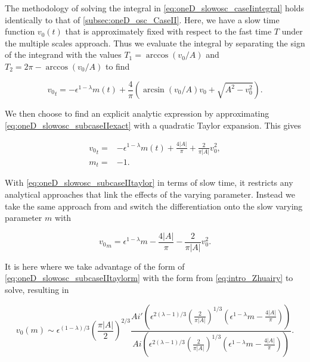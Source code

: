 \indent The methodology of solving the integral in \eqref{eq:oneD_slowosc_caseIintegral} holds identically to that of \autoref{subsec:oneD_osc_CaseII}. Here, we have a slow time function $v_0(t)$ that is approximately fixed with respect to the fast time $T$ under the multiple scales approach. Thus we evaluate the integral by separating the sign of the integrand with the values $T_1=\arccos(v_0/A)$ and $T_2 = 2\pi-\arccos(v_0/A)$ to find

\begin{equation}\label{eq:oneD_slowosc_subcaseIIexact}
{v_0}_t=-\epsilon^{1-\lambda}m(t)+\frac{4}{\pi}\left(\arcsin(v_0/A)v_0+\sqrt{A^2-v_0^2}\right).
\end{equation}

We then choose to find an explicit analytic expression by approximating \eqref{eq:oneD_slowosc_subcaseIIexact} with a quadratic Taylor expansion. This gives

\begin{equation}\label{eq:oneD_slowosc_subcaseIItaylor}
\begin{aligned}
{v_0}_t =& -\epsilon^{1-\lambda}m(t) + \frac{4|A|}{\pi} + \frac{2}{\pi |A|}v_0^2,\\
m_t =& -1.
\end{aligned}
\end{equation}

With \eqref{eq:oneD_slowosc_subcaseIItaylor} in terms of slow time, it restricts any analytical approaches that link the effects of the varying parameter. Instead we take the same approach from \cite{haberman1979slowly} and switch the differentiation onto the slow varying parameter $m$ with

\begin{equation}\label{eq:oneD_slowosc_subcaseIItaylorm}
{v_0}_m = \epsilon^{1-\lambda}m - \frac{4|A|}{\pi} - \frac{2}{\pi |A|}v_0^2.
\end{equation}

It is here where we take advantage of the form of \eqref{eq:oneD_slowosc_subcaseIItaylorm} with the form from \eqref{eq:intro_Zhuairy} to solve, resulting in

\begin{equation*}
v_0(m)\sim \epsilon^{(1-\lambda)/3}\left( \frac{\pi |A|}{2} \right)^{2/3}\frac{Ai'\left(\epsilon^{2(\lambda-1)/3}\left(\frac{2}{\pi |A|}\right)^{1/3}(\epsilon^{1-\lambda}m-\frac{4|A|}{\pi})\right)}{Ai\left(\epsilon^{2(\lambda-1)/3}\left(\frac{2}{\pi |A|}\right)^{1/3}(\epsilon^{1-\lambda}m-\frac{4|A|}{\pi})\right)}.
\end{equation*}

